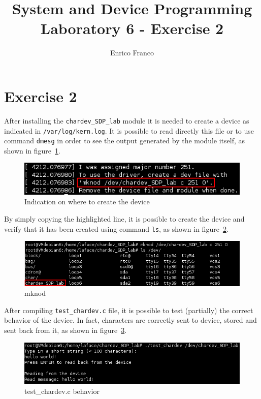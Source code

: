 \documentclass{report}
\author{Enrico Franco}
\title{System and Device Programming \\
	Laboratory 6 - Exercise 2}
\begin{document}
\section*{Exercise 2}
After installing the \texttt{chardev\_SDP\_lab} module it is needed to create a device as indicated in \texttt{/var/log/kern.log}. It is possible to read directly this file or to use command \texttt{dmesg} in order to see the output generated by the module itself, as shown in figure~\ref{img:dmesg_device_indication}.

\begin{figure}[hbtp]
\centering
\includegraphics[scale=0.5]{images/es02/dmesg_device_indication.png}
\caption{Indication on where to create the device}
\label{img:dmesg_device_indication}
\end{figure}

By simply copying the highlighted line, it is possible to create the device and verify that it has been created using command \texttt{ls}, as shown in figure~\ref{img:mknod}.

\begin{figure}[hbtp]
\centering
\includegraphics[scale=0.5]{images/es02/mknod.png}
\caption{mknod}
\label{img:mknod}
\end{figure}

After compiling \texttt{test\_chardev.c} file, it is possible to test (partially) the correct behavior of the device. In fact, characters are correctly sent to device, stored and sent back from it, as shown in figure~\ref{img:test_chardev}.

\begin{figure}[hbtp]
\centering
\includegraphics[scale=0.5]{images/es02/test_chardev.png}
\caption{test\_chardev.c behavior}
\label{img:test_chardev}
\end{figure}
\end{document}

